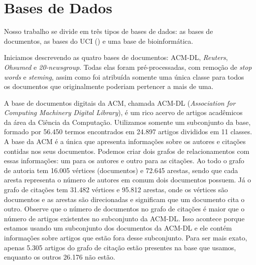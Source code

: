 

\section{Bases de Dados}
\label{subsec::base}

Nosso trabalho se divide em três tipos de bases de dados: as bases de documentos, as bases do \textsc{UCI} (\cite{UCI98}) e uma base de bioinformática.

Iniciamos descrevendo as quatro bases de documentos: \textsc{ACM-DL}, \textit{Reuters}, \textit{Ohsumed} e \textit{20-newsgroup}. 
 Todas elas foram pré-processadas, com remoção de \textit{stop words} e \textit{steming}, assim como foi atribuída somente uma única classe para todos os documentos que originalmente poderiam pertencer a mais de uma.

A base de documentos digitais da \textsc{ACM}, chamada \textsc{ACM-DL} (\textit{Association for Computing Machinery Digital Library}), é um rico acervo de artigos acadêmicos da área da Ciência da Computação. Utilizamos somente um subconjunto da base, formado por 56.450 termos encontrados em 24.897 artigos divididos em 11 classes. 
A base da \textsc{ACM} é a única que apresenta informações sobre os autores e citações contidas nos seus documentos. 
Podemos criar dois grafos de relacionamentos com essas informações: um para os autores e outro para as citações.
Ao todo o grafo de autoria tem 16.005 vértices (documentos) e 72.645 arestas, sendo que cada aresta representa o número de autores em comum dois documentos possuem.
Já o grafo de citações tem 31.482 vértices e 95.812 arestas, onde os vértices são documentos e as arestas são direcionadas e significam que um documento cita o outro. 
Observe que o número de documentos no grafo de citações é maior que o número de artigos existentes no subconjunto da \textsc{ACM-DL}. Isso acontece porque estamos usando um subconjunto dos documentos da \textsc{ACM-DL} e ele contém informações sobre artigos que estão fora desse subconjunto. Para ser mais exato, apenas 5.305 artigos do grafo de citação estão presentes na base que usamos, enquanto os outros 26.176 não estão.

